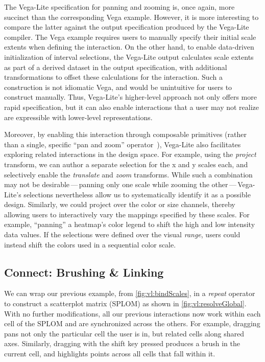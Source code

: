 The Vega-Lite specification for panning and zooming is, once again, more
succinct than the corresponding Vega example. However, it is more interesting to
compare the latter against the output specification produced by the Vega-Lite
compiler. The Vega example requires users to manually specify their initial
scale extents when defining the interaction. On the other hand, to enable
data-driven initialization of interval selections, the Vega-Lite output
calculates scale extents as part of a derived dataset in the output
specification, with additional transformations to offset these calculations for
the interaction. Such a construction is not idiomatic Vega, and would be
unintuitive for users to construct manually. Thus, Vega-Lite's higher-level
approach not only offers more rapid specification, but it can also enable
interactions that a user may not realize are expressible with lower-level
representations.

Moreover, by enabling this interaction through composable primitives (rather
than a single, specific ``pan and zoom'' operator~\cite{bostock:d3}), Vega-Lite
also facilitates exploring related interactions in the design space. For
example, using the \emph{project} transform, we can author a separate selection
for the x and y scales each, and selectively enable the \emph{translate} and
\emph{zoom} transforms. While such a combination may not be
desirable\,---\,panning only one scale while zooming the other\,---\,Vega-Lite's
selections nevertheless allow us to systematically identify it as a possible
design. Similarly, we could project over the color or size channels, thereby
allowing users to interactively vary the mappings specified by these scales. For
example, ``panning'' a heatmap's color legend to shift the high and low
intensity data values. If the selections were defined over the visual
\emph{range}, users could instead shift the colors used in a sequential color
scale.

\subsection{Connect: Brushing \& Linking}

We can wrap our previous example, from \cref{fig:vl:bindScales}, in a \emph{repeat}
operator to construct a scatterplot matrix (SPLOM) as shown in
\cref{fig:vl:resolveGlobal}. With no further modifications, all our previous
interactions now work within each cell of the SPLOM and are synchronized across
the others. For example, dragging pans not only the particular cell the user is
in, but related cells along shared axes. Similarly, dragging with the shift key
pressed produces a brush in the current cell, and highlights points across all
cells that fall within it.

